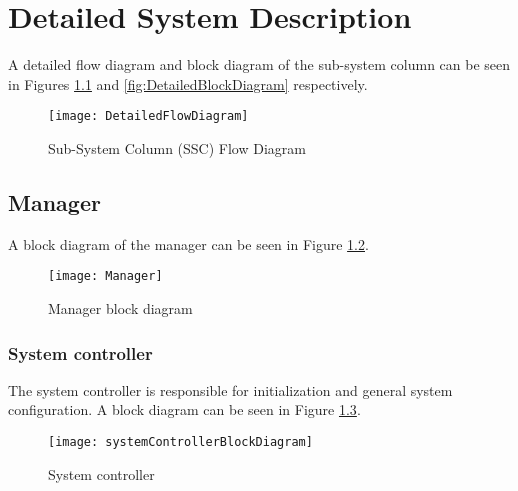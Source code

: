 

\chapter{Detailed System Description}
\label{sec:Detailed System Description}

A detailed flow diagram and block diagram of the sub-system column can be seen in Figures \ref{fig:DetailedFlowDiagram} and \ref{fig:DetailedBlockDiagram} respectively.
\begin{figure}[!htbp]
\centering
\captionsetup{justification=centering}
\captionsetup{width=.9\linewidth}
\centerline{
\mbox{\texttt{[image: DetailedFlowDiagram]}}
}
\center\caption{Sub-System Column (SSC) Flow Diagram}
\label{fig:DetailedFlowDiagram}
\end{figure}

\section{Manager}
\label{sec:manager}

A block diagram of the manager can be seen in Figure \ref{fig:Manager block diagram}.
\begin{figure}[!htbp]
\centering
\captionsetup{justification=centering}
\captionsetup{width=.9\linewidth}
\centerline{
\mbox{\texttt{[image: Manager]}}
}
\center\caption{Manager block diagram}
\label{fig:Manager block diagram}
\end{figure}

\subsection{System controller}
\label{sec:System controller}

The system controller is responsible for initialization and general system configuration.
A block diagram can be seen in Figure \ref{fig:System controller}.

\begin{figure}[!htbp]
\centering
\captionsetup{justification=centering}
\captionsetup{width=.9\linewidth}
\centerline{
\mbox{\texttt{[image: systemControllerBlockDiagram]}}
}
\center\caption{System controller}
\label{fig:System controller}
\end{figure}

